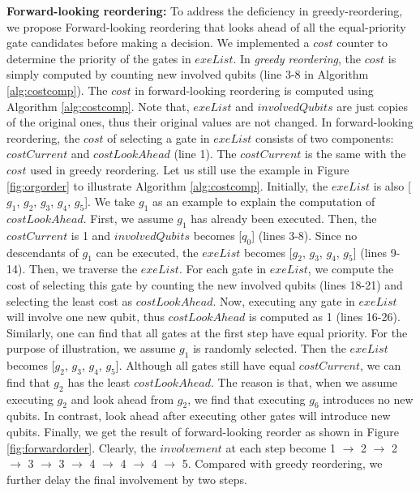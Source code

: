 \noindent\textbf{Forward-looking reordering:}
To address the deficiency in greedy-reordering, we propose Forward-looking reordering that looks ahead of all the equal-priority gate candidates before making a decision. We implemented a $cost$ counter to determine the priority of the gates in $exeList$. In \textit{greedy reordering}, the $cost$ is simply computed by counting new involved qubits (line 3-8 in Algorithm \ref{alg:costcomp}). 
The $cost$ in forward-looking reordering is computed using Algorithm \ref{alg:costcomp}. Note that, $exeList$ and $involvedQubits$ are just copies of the original ones, thus their original values are not changed. In forward-looking reordering, the $cost$ of selecting a gate in $exeList$ consists of two components: $costCurrent$ and $costLookAhead$ (line 1). The $costCurrent$ is the same with the $cost$ used in greedy reordering. Let us still use the example in Figure \ref{fig:orgorder} to illustrate Algorithm \ref{alg:costcomp}. 
Initially, the $exeList$ is also [$g_1$, $g_2$, $g_3$, $g_4$, $g_5$]. We take $g_1$ as an example to explain the computation of $costLookAhead$. First, we assume $g_1$ has already been executed. Then, the $costCurrent$ is 1 and $involvedQubits$ becomes [$q_0$] (lines 3-8). Since no descendants of $g_1$ can be executed, the $exeList$ becomes [$g_2$, $g_3$, $g_4$, $g_5$] (lines 9-14). Then, we traverse the $exeList$. For each gate in $exeList$, we compute the cost of selecting this gate by counting the new involved qubits (lines 18-21) and selecting the least cost as $costLookAhead$.
Now, executing any gate in $exeList$ will involve one new qubit, thus $costLookAhead$ is computed as 1 (lines 16-26). Similarly, one can find that all gates at the first step have equal priority. 
For the purpose of illustration, we assume $g_1$ is randomly selected. Then the $exeList$ becomes [$g_2$, $g_3$, $g_4$, $g_5$].
Although all gates still have equal $costCurrent$, we can find that $g_2$ has the least $costLookAhead$. The reason is that, when we assume executing $g_2$ and look ahead from $g_2$, we find that executing $g_6$ introduces no new qubits. In contrast, look ahead after executing other gates will introduce new qubits.   
Finally, we get the result of forward-looking reorder as shown in Figure \ref{fig:forwardorder}. 
Clearly, the $involvement$ at each step become 1 $\to$ 2 $\to$ 2 $\to$ 3 $\to$ 3 $\to$ 4 $\to$ 4 $\to$ 4 $\to$ 5. Compared with greedy reordering, we further delay the final involvement by two steps. 

